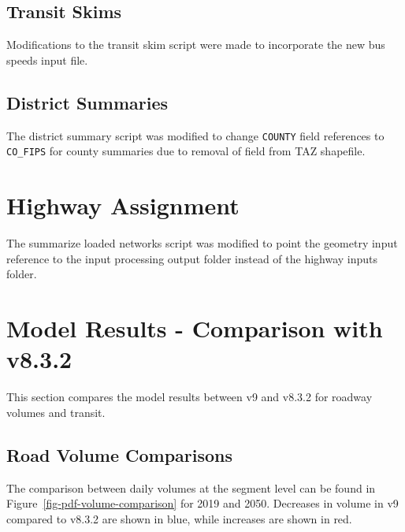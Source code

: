 \documentclass[
  letterpaper,
  DIV=11,
  numbers=noendperiod]{scrreprt}
\begin{document}
\hypertarget{transit-skims}{%
\section{Transit Skims}\label{transit-skims}}

Modifications to the transit skim script were made to incorporate the
new bus speeds input file.

\hypertarget{district-summaries}{%
\section{District Summaries}\label{district-summaries}}

The district summary script was modified to change \texttt{COUNTY} field
references to \texttt{CO\_FIPS} for county summaries due to removal of
field from TAZ shapefile.


\hypertarget{highway-assignment}{%
\chapter{Highway Assignment}\label{highway-assignment}}

The summarize loaded networks script was modified to point the geometry
input reference to the input processing output folder instead of the
highway inputs folder.


\hypertarget{model-results---comparison-with-v8.3.2}{%
\chapter{Model Results - Comparison with
v8.3.2}\label{model-results---comparison-with-v8.3.2}}

This section compares the model results between v9 and v8.3.2 for
roadway volumes and transit.

\hypertarget{road-volume-comparisons}{%
\section{Road Volume Comparisons}\label{road-volume-comparisons}}

The comparison between daily volumes at the segment level can be found
in Figure~\ref{fig-pdf-volume-comparison} for 2019 and 2050. Decreases
in volume in v9 compared to v8.3.2 are shown in blue, while increases
are shown in red.
\end{document}

